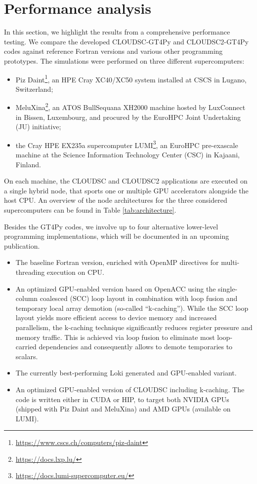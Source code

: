 \documentclass[main.tex]{subfiles}
\begin{document}
    \justifying

    \section{Performance analysis}
    \label{section:performance-analysis}

        In this section, we highlight the results from a comprehensive performance testing. We compare the developed CLOUDSC-GT4Py and CLOUDSC2-GT4Py codes against reference Fortran versions and various other programming prototypes. The simulations were performed on three different supercomputers:
        \begin{itemize}
            \item[(i)] Piz Daint\footnote{\url{https://www.cscs.ch/computers/piz-daint}}, an HPE Cray XC40/XC50 system installed at CSCS in Lugano, Switzerland;
            \item[(ii)] MeluXina\footnote{\url{https://docs.lxp.lu/}}, an ATOS BullSequana XH2000 machine hosted by LuxConnect in Bissen, Luxembourg, and procured by the EuroHPC Joint Undertaking (JU) initiative;
            \item[(iii)] the Cray HPE EX235a supercomputer LUMI\footnote{\url{https://docs.lumi-supercomputer.eu/}}, an EuroHPC pre-exascale machine at the Science Information Technology Center (CSC) in Kajaani, Finland.
        \end{itemize}
        On each machine, the CLOUDSC and CLOUDSC2 applications are executed on a single hybrid node, that sports one or multiple GPU accelerators alongside the host CPU. An overview of the node architectures for the three considered supercomputers can be found in Table \ref{tab:architecture}.

        Besides the GT4Py codes, we involve up to four alternative lower-level programming implementations, which will be documented in an upcoming publication.
        \begin{itemize}
            \item[(a)] The baseline Fortran version, enriched with OpenMP directives for multi-threading execution on CPU.
            \item[(b)] An optimized GPU-enabled version based on OpenACC using the single-column coalesced (SCC) loop layout in combination with loop fusion and temporary local array demotion (so-called ``k-caching''). While the SCC loop layout yields more efficient access to device memory and increased parallelism, the k-caching technique significantly reduces register pressure and memory traffic. This is achieved via loop fusion to eliminate most loop-carried dependencies and consequently allows to demote temporaries to scalars.
            \item[(c)] The currently best-performing Loki generated and GPU-enabled variant.
            \item[(d)] An optimized GPU-enabled version of CLOUDSC including k-caching. The code is written either in CUDA or HIP, to target both NVIDIA GPUs (shipped with Piz Daint and MeluXina) and AMD GPUs (available on LUMI).
        \end{itemize}
\end{document}
